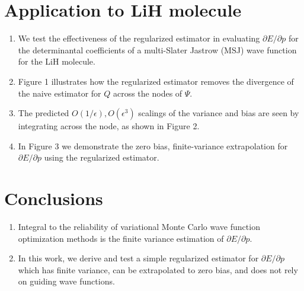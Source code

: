 \documentclass{article}
\begin{document}
\section{Application to LiH molecule}
\begin{enumerate}
\item We test the effectiveness of the regularized estimator in evaluating $\partial E/\partial p$ for the determinantal coefficients of a multi-Slater Jastrow (MSJ) wave function for the LiH molecule.

\item Figure 1 illustrates how the regularized estimator removes the divergence of the naive estimator for $Q$ across the nodes of $\Psi$.

\item The predicted $O(1/\epsilon), O(\epsilon^3)$ scalings of the variance and bias are seen by integrating across the node, as shown in Figure 2. 

\item In Figure 3 we demonstrate the zero bias, finite-variance extrapolation for $\partial E/\partial p$ using the regularized estimator.
\end{enumerate}

\section{Conclusions}
\begin{enumerate}
\item Integral to the reliability of variational Monte Carlo wave function optimization methods is the finite variance estimation of $\partial E/\partial p$.

\item  In this work, we derive and test a simple regularized estimator for $\partial E/\partial p$ which has finite variance, can be extrapolated to zero bias, and does not rely on guiding wave functions.
\end{enumerate}



\end{document}
